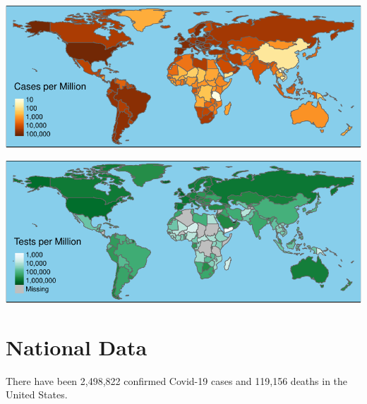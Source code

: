 \documentclass[]{article}
\begin{document}
\includegraphics{covid_files/figure-latex/unnamed-chunk-5-1.pdf}

\includegraphics{covid_files/figure-latex/unnamed-chunk-6-1.pdf}

\newpage

\hypertarget{national-data}{%
\section{National Data}\label{national-data}}

There have been 2,498,822 confirmed Covid-19 cases and 119,156 deaths in
the United States.
\end{document}
